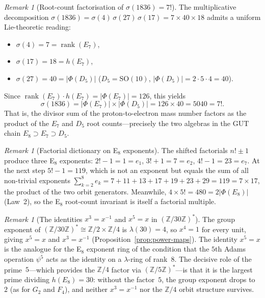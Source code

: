 \documentclass[11pt]{amsart}
\theoremstyle{plain}
\theoremstyle{definition}
\theoremstyle{remark}
\newtheorem{remark}[theorem]{Remark}
\renewcommand{\Phi}{\varPhi}
\newcommand{\rank}{\operatorname{rank}}
\begin{document}
\begin{remark}[Root-count factorisation of $\sigma(1836) = 7!$]%
\label{rem:sigma-1836-E7D5}
The multiplicative decomposition
$\sigma(1836) = \sigma(4)\,\sigma(27)\,\sigma(17) = 7 \times 40 \times 18$
admits a uniform Lie-theoretic reading:
\begin{itemize}
  \item $\sigma(4) = 7 = \rank(E_7)$,
  \item $\sigma(17) = 18 = h(E_7)$,
  \item $\sigma(27) = 40 = |\Phi(D_5)|$
        \quad ($D_5 = \mathrm{SO}(10)$, $|\Phi(D_5)| = 2 \cdot 5 \cdot 4 = 40$).
\end{itemize}
Since $\rank(E_7) \cdot h(E_7) = |\Phi(E_7)| = 126$, this yields
\[
  \sigma(1836) = |\Phi(E_7)| \times |\Phi(D_5)| = 126 \times 40 = 5040 = 7!.
\]
That is, the divisor sum of the proton-to-electron mass number
factors as the product of the $E_7$ and $D_5$ root counts---precisely
the two algebras in the GUT chain $E_8 \supset E_7 \supset D_5$.
\end{remark}

\begin{remark}[Factorial dictionary on E$_8$ exponents]%
\label{rem:factorial-dict}
The shifted factorials $n! \pm 1$ produce three E$_8$ exponents:
$2! - 1 = 1 = e_1$, $3! + 1 = 7 = e_2$, $4! - 1 = 23 = e_7$.
At the next step $5! - 1 = 119$, which is not an exponent but equals
the sum of all non-trivial exponents
$\sum_{k=2}^{8} e_k = 7 + 11 + 13 + 17 + 19 + 23 + 29 = 119 = 7 \times 17$,
the product of the two orbit generators.  Meanwhile,
$4 \times 5! = 480 = 2|\Phi(E_8)|$ (Law~2), so the E$_8$
root-count invariant is itself a factorial multiple.
\end{remark}

\begin{remark}[The identities $x^3 = x^{-1}$ and $x^5 = x$
  in $(\mathbb{Z}/30\mathbb{Z})^*$]\label{rem:x5-Adams}
The group exponent of $(\mathbb{Z}/30\mathbb{Z})^* \cong
\mathbb{Z}/2 \times \mathbb{Z}/4$ is $\lambda(30) = 4$,
so $x^4 = 1$ for every unit, giving $x^5 = x$ and
$x^3 = x^{-1}$ (Proposition~\ref{prop:power-maps}).
The identity $x^5 = x$ is the analogue for the E$_8$ exponent ring
of the condition that the $5$th Adams operation $\psi^5$ acts as
the identity on a $\lambda$-ring of rank~$8$.  The decisive role of
the prime~$5$---which provides the $\mathbb{Z}/4$ factor via
$(\mathbb{Z}/5\mathbb{Z})^*$---is that it is the largest prime
dividing $h(E_8) = 30$: without the factor~$5$, the group exponent
drops to~$2$ (as for $G_2$ and $F_4$), and neither $x^3 = x^{-1}$
nor the $\mathbb{Z}/4$ orbit structure survives.
\end{remark}
\end{document}

